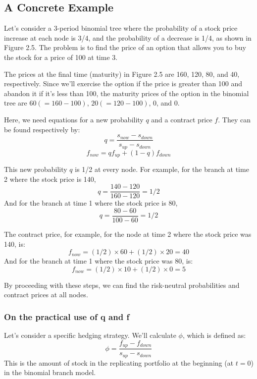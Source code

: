 \documentclass[uplatex,a4j,12pt,dvipdfmx]{jsarticle}
\begin{document}
\subsection{A Concrete Example}
Let's consider a 3-period binomial tree where the probability of a stock price increase at each node is 3/4, and the probability of a decrease is 1/4, as shown in Figure 2.5. The problem is to find the price of an option that allows you to buy the stock for a price of 100 at time 3.

The prices at the final time (maturity) in Figure 2.5 are 160, 120, 80, and 40, respectively. Since we'll exercise the option if the price is greater than 100 and abandon it if it's less than 100, the maturity prices of the option in the binomial tree are $60(=160-100)$, $20(=120-100)$, $0$, and $0$.

Here, we need equations for a new probability $q$ and a contract price $f$. They can be found respectively by:
\[q = \frac{s_{now} - s_{down}}{s_{up} - s_{down}}\]
\[f_{now} = qf_{up} + (1-q)f_{down}\]

This new probability $q$ is 1/2 at every node. For example, for the branch at time 2 where the stock price is 140,
\[q = \frac{140 - 120}{160 - 120} = 1/2\]
And for the branch at time 1 where the stock price is 80,
\[q = \frac{80 - 60}{100 - 60} = 1/2\]

The contract price, for example, for the node at time 2 where the stock price was 140, is:
\[f_{now} = (1/2) \times 60 + (1/2) \times 20 = 40\]
And for the branch at time 1 where the stock price was 80, is:
\[f_{now} = (1/2) \times 10 + (1/2) \times 0 = 5\]

By proceeding with these steps, we can find the risk-neutral probabilities and contract prices at all nodes.

\subsubsection{On the practical use of q and f}
Let's consider a specific hedging strategy. We'll calculate $\phi$, which is defined as:
\[\phi = \frac{f_{up} - f_{down}}{s_{up} - s_{down}}\]
This is the amount of stock in the replicating portfolio at the beginning (at $t=0$) in the binomial branch model.
\end{document}
